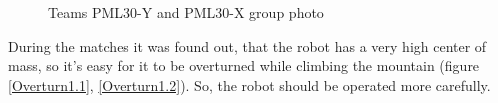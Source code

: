 \begin{figure}[H]
\begin{minipage}[h]{0.47\linewidth}
		\caption{Teams PML30-Y and PML30-X group photo}
	\end{minipage}
\end{figure}

During the matches it was found out, that the robot has a very high center of mass, so it's easy for it to be overturned while climbing the mountain (figure \ref{Overturn1.1}, \ref{Overturn1.2}). So, the robot should be operated more carefully.

